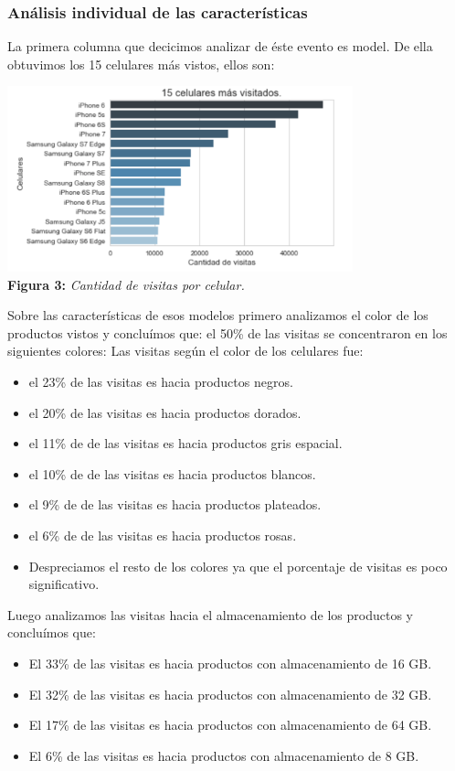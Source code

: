 \documentclass[titlepage,a4paper]{article}
\begin{document}
	\subsubsection{Análisis individual de las características}
	La primera columna que decicimos analizar de éste evento es model. De ella obtuvimos los 15 celulares más vistos, ellos son:
	\begin{center}
	\includegraphics[width=10cm]{15celularesMasVisitados.jpg}\\
	\textbf{Figura 3:}  \textit{Cantidad de visitas por celular.}
	\end{center}
	 Sobre las características de esos modelos primero analizamos el color de los productos vistos y concluímos que: el 50\% de las visitas se concentraron en los siguientes colores:
	 Las visitas según el color de los celulares fue:
	\begin{itemize}
	\item el 23\% de las visitas es hacia productos negros.
	\item el 20\% de las visitas es hacia productos dorados.
	\item el 11\% de de las visitas es hacia productos gris espacial.
    \item el 10\% de de las visitas es hacia productos blancos.
     \item el 9\% de de las visitas es hacia productos plateados.
     \item el 6\% de de las visitas es hacia productos rosas.
     \item Despreciamos el resto de los colores ya que el porcentaje de visitas es poco significativo. 
	\end{itemize}	   
	Luego analizamos las visitas hacia el almacenamiento de los productos y concluímos que:
	\begin{itemize}
	\item El 33\% de las visitas es hacia productos con almacenamiento de 16 GB.
    \item El 32\% de las visitas es hacia productos con almacenamiento de 32 GB.
    \item El 17\% de las visitas es hacia productos con almacenamiento de 64 GB.
    \item El 6\% de las visitas es hacia productos con almacenamiento de 8 GB.
	\end{itemize}
\end{document}
